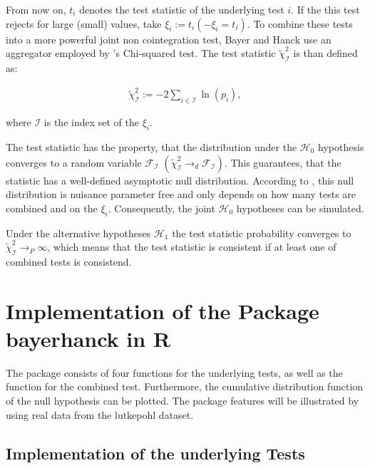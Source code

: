 \documentclass[11pt,a4paper]{article}
\begin{document}
From now on, \(t_i\) denotes the test statistic of the underlying test
\(i\). If the this test rejects for large (small) values, take
\(\xi_i := t_i (-\xi_i = t_i)\). To combine these tests into a more
powerful joint non cointegration test, Bayer and Hanck use an aggregator
employed by \textcite{Fisher1925}'s Chi-squared test. The test statistic
\(\tilde{\chi}_{\mathcal{I}}^2\) is than defined as:

\begin{align}
  \label{eq:bayer-hanck}
  \tilde{\chi}_{\mathcal{I}}^{2} := -2 \sum_{i \in \mathcal{I}} \ln(p_i),
\end{align}

where \(\mathcal{I}\) is the index set of the \(\xi_i\).

The test statistic has the property, that the distribution under the
\(\mathcal{H}_0\) hypothesis converges to a random variable
\(\mathcal{F}_{\mathcal{I}}\)
\(\left(\tilde{\chi}_{\mathcal{I}}^{2} \rightarrow_{d} \mathcal{F}_{\mathcal{I}} \right)\).
This guarantees, that the statistic has a well-defined asymptotic null
distribution. According to \textcite{Bayerhanck2009}, this null
distribution is nuisance parameter free and only depends on how many
tests are combined and on the \(\xi_i\). Consequently, the joint
\(\mathcal{H_0}\) hypotheses can be simulated.

Under the alternative hypotheses \(\mathcal{H}_1\) the test statistic
probability converges to
\(\tilde{\chi}_{\mathcal{I}}^{2} \rightarrow_P \infty\), which means
that the test statistic is consistent if at least one of combined tests
is consistend.

\hypertarget{implementation-of-the-package-bayerhanck-in-r}{%
\section{\texorpdfstring{Implementation of the Package
\textbf{bayerhanck} in
R}{Implementation of the Package bayerhanck in R}}\label{implementation-of-the-package-bayerhanck-in-r}}

The package consists of four functions for the underlying tests, as well
as the function for the combined test. Furthermore, the cumulative
distribution function of the null hypothesis can be plotted. The package
features will be illustrated by using real data from the lutkepohl
dataset.

\hypertarget{implementation-of-the-underlying-tests}{%
\subsection{Implementation of the underlying
Tests}\label{implementation-of-the-underlying-tests}}
\end{document}
